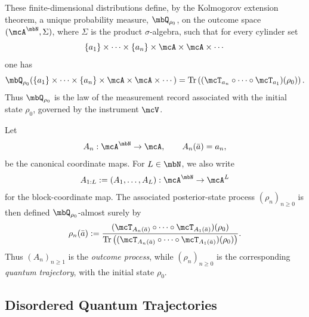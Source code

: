 \documentclass[a4paper]{article}
\numberwithin{equation}{section}   %
\theoremstyle{plain}   %
\theoremstyle{plain}   %
\theoremstyle{examplestyle}
\renewcommand{\tr}[1]{\operatorname{Tr}\left(#1\right)} %
\begin{document}
These finite-dimensional distributions define, by the Kolmogorov extension theorem, a unique probability measure, $\mbQ_{\rho_0}$, on the outcome space \((\mcA^{\mbN},\Sigma)\), where \(\Sigma\) is the product \(\sigma\)-algebra, such that for every cylinder set
%
\[
    \{a_1\}\times\cdots\times\{a_n\}\times\mcA\times\mcA\times\cdots
\]
%
one has
%
\begin{equation}
    \mbQ_{\rho_0}\!\left(
        \{a_1\}\times\cdots\times\{a_n\}\times\mcA\times\mcA\times\cdots
    \right)
    =
    \tr{(\mcT_{a_n}\circ\cdots\circ\mcT_{a_1})(\rho_0)}.
\end{equation}
%
Thus \(\mbQ_{\rho_0}\) is the law of the measurement record associated with the initial state \(\rho_0\), governed by the instrument $\mcV$.

Let
\[
    A_n:\mcA^\mbN\to\mcA,
    \qquad
    A_n(\bar a)=a_n,
\]
be the canonical coordinate maps. For \(L\in\mbN\), we also write
\[
    A_{1:L}:=(A_1,\dots,A_L):\mcA^\mbN\to\mcA^L
\]
for the block-coordinate map. The associated posterior-state process \((\rho_n)_{n\ge0}\) is then defined \(\mbQ_{\rho_0}\)-almost surely by
\[
    \rho_n(\bar a)
    :=
    \frac{
        (\mcT_{A_n(\bar a)}\circ\cdots\circ\mcT_{A_1(\bar a)})(\rho_0)
    }{
        \tr{
            (\mcT_{A_n(\bar a)}\circ\cdots\circ\mcT_{A_1(\bar a)})(\rho_0)
        }
    }.
\]
Thus \((A_n)_{n\ge1}\) is the \emph{outcome process}, while \((\rho_n)_{n\ge0}\) is the corresponding \emph{quantum trajectory}, with the initial state $\rho_0$.


\subsection{Disordered Quantum Trajectories}
\label{section:Disordered_Traj}

\end{document}
